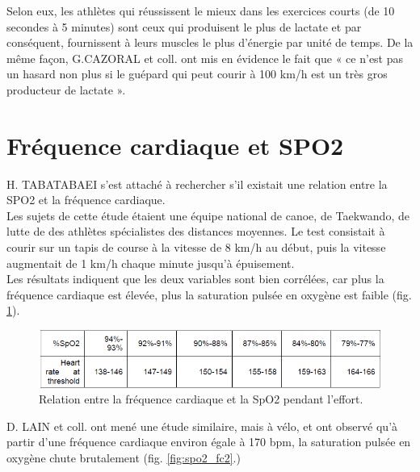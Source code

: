         Selon eux, les athlètes qui réussissent le mieux dans les exercices courts (de 10 secondes à 5 minutes) sont ceux qui produisent le plus de lactate et par conséquent, fournissent à leurs muscles le plus d’énergie par unité de temps. De la même façon, G.CAZORAL et coll. \cite{cazorla01} ont mis en évidence le fait que « ce n’est pas un hasard non plus si le guépard qui peut courir à 100 km/h est un très gros producteur de lactate ».  \\        
    

    \section {Fréquence cardiaque et SPO2}

        H. TABATABAEI \cite{tabatabaei00} s'est attaché à rechercher s'il existait une relation entre la SPO2 et la fréquence cardiaque.\\
        
        Les sujets de cette étude étaient une équipe national de canoe, de Taekwando, de lutte de des athlètes spécialistes des distances moyennes. Le test consistait à courir sur un tapis de course à la vitesse de 8 km/h au début, puis la vitesse augmentait de 1 km/h chaque minute jusqu'à épuisement. \\
        
        Les résultats indiquent que les deux variables sont bien corrélées, car plus la fréquence cardiaque est élevée, plus la saturation pulsée en oxygène est faible (fig. \ref{fig:spo2_fc}).\\
     
         \begin{figure}[H]
            \centering
            \includegraphics[scale=0.8]{images/spo2_fc.PNG}
            \caption{\label{fig:spo2_fc} Relation entre la fréquence cardiaque et la SpO2 pendant l'effort.}
        \end{figure}
        
        D. LAIN et coll. \cite{lain13} ont mené une étude similaire, mais à vélo, et ont observé qu'à partir d'une fréquence cardiaque environ égale à 170 bpm, la saturation pulsée en oxygène chute brutalement (fig. \ref{fig:spo2_fc2}.)
        
